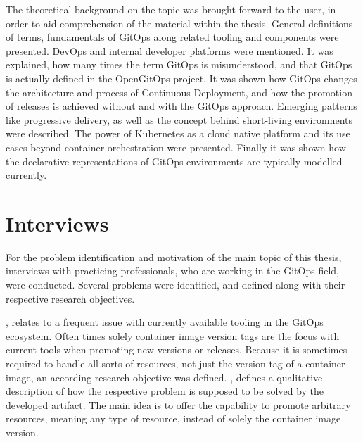 The theoretical background on the topic was brought forward to the user,
in order to aid comprehension of the material within the thesis.
General definitions of terms,
fundamentals of GitOps along related tooling and components were presented.
DevOps and internal developer platforms were mentioned.
It was explained, how many times the term GitOps is misunderstood,
and that GitOps is actually defined in the OpenGitOps project.
It was shown how GitOps changes the architecture and process of Continuous Deployment,
and how the promotion of releases is achieved without and with the GitOps approach.
Emerging patterns like progressive delivery,
as well as the concept behind short-living environments were described.
The power of Kubernetes as a cloud native platform and its use cases beyond container orchestration were presented.
Finally it was shown how the declarative representations of GitOps environments are typically modelled currently.

\section*{Interviews}

For the problem identification and motivation of the main topic of this thesis,
interviews with practicing professionals, who are working in the GitOps field, were conducted.
Several problems were identified,
and defined along with their respective research objectives.

,
relates to a frequent issue with currently available tooling in the GitOps ecosystem. 
Often times solely container image version tags are the focus with current tools when promoting
new versions or releases.
Because it is sometimes required to handle all sorts of resources, not just the version tag of a container image,
an according research objective was defined.
,
defines a qualitative description of how the respective problem is supposed to be solved
by the developed artifact. The main idea is to offer the capability to promote arbitrary resources,
meaning any type of resource, instead of solely the container image version.

